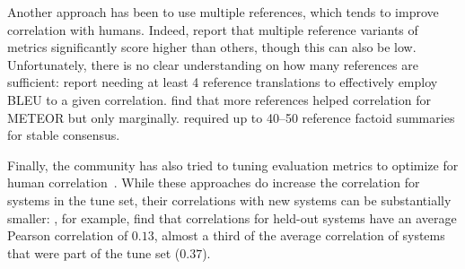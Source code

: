 Another approach has been to use multiple references, which tends to improve correlation with humans.
Indeed, \citet{toutanova2016dataset} report that multiple reference variants of metrics significantly score higher than others, though this can also be low.
Unfortunately, there is no clear understanding on how many references are sufficient: 
  \citet{culy2003limits} report needing at least 4 reference translations to effectively employ BLEU to a given correlation.
  \citet{lavie2009meteor} find that more references helped correlation for METEOR but only marginally.
\citet{vanhalteren2003factoid} required up to 40--50 reference factoid summaries for stable consensus.

Finally, the community has also tried to tuning evaluation metrics to optimize for human correlation~\citep{lavie2009meteor,denkowski2014meteor,lowe2017towards}.
While these approaches do increase the correlation for systems in the tune set, their correlations with new systems can be substantially smaller: \citet{lowe2017towards}, for example, find that correlations for held-out systems have an average Pearson correlation of $0.13$, almost a third of the average correlation of systems that were part of the tune set ($0.37$).

